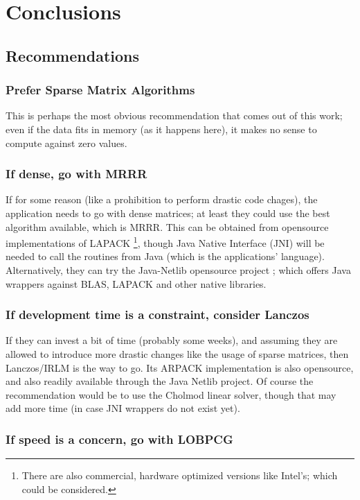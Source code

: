 \chapter{Conclusions}

\section{Recommendations}

\subsection{Prefer Sparse Matrix Algorithms}

This is perhaps the most obvious recommendation that comes out of this
work; even if the data fits in memory (as it happens here), it makes
no sense to compute against zero values.

\subsection{If dense, go with MRRR}

If for some reason (like a prohibition to perform drastic code
chages), the application needs to go with dense matrices; at least
they could use the best algorithm available, which is MRRR. This can
be obtained from opensource implementations of LAPACK \footnote{There
  are also commercial, hardware optimized versions like Intel's; which
  could be considered.}, though Java
Native Interface (JNI) will be needed to call the routines from Java (which
is the applications' language). Alternatively, they can try the
Java-Netlib opensource project \cite{jnetlib}; which offers Java
wrappers against BLAS, LAPACK and other native libraries.

\subsection{If development time is a constraint, consider Lanczos}

If they can invest a bit of time (probably some weeks), and assuming
they are allowed to introduce more drastic changes like the usage of
sparse matrices, then Lanczos/IRLM is the way to go. Its ARPACK
implementation is also opensource, and also readily available through
the Java Netlib project. Of course the recommendation would be to use
the Cholmod linear solver, though that may add more time (in case JNI
wrappers do not exist yet).

\subsection{If speed is a concern, go with LOBPCG}

